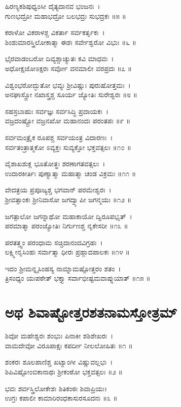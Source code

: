 ಹಿರಣ್ಯಕಶಿಪುಧ್ವಂಸೀ ದೈತ್ಯದಾನವ ಭಂಜನಃ~।\\
ಗುಣಭದ್ರೋ ಮಹಾಭದ್ರೋ ಬಲಭದ್ರಃ ಸುಭದ್ರಕಃ ॥೫ ॥

ಕರಾಳೋ ವಿಕರಾಳಶ್ಚ ವಿಕರ್ತಾ ಸರ್ವಕರ್ತೃಕಃ~।\\
ಶಿಂಶುಮಾರಸ್ತ್ರಿಲೋಕಾತ್ಮಾ ಈಶಃ ಸರ್ವೇಶ್ವರೋ ವಿಭುಃ ॥೬ ॥

ಭೈರವಾಡಂಬರೋ ದಿವ್ಯಶ್ಚಾಚ್ಯುತಃ ಕವಿ ಮಾಧವಃ~।\\
ಅಧೋಕ್ಷಜೋಽಕ್ಷರಃ ಸರ್ವೋ ವನಮಾಲೀ ವರಪ್ರದಃ ॥೭ ॥

ವಿಶ್ವಂಭರೋದ್ಭುತೋ ಭವ್ಯಃ ಶ್ರೀವಿಷ್ಣುಃ ಪುರುಷೋತ್ತಮಃ~।\\
ಅನಘಾಸ್ತ್ರೋ ನಖಾಸ್ತ್ರಶ್ಚ ಸೂರ್ಯ ಜ್ಯೋತಿಃ ಸುರೇಶ್ವರಃ ॥೮ ॥

ಸಹಸ್ರಬಾಹುಃ ಸರ್ವಜ್ಞಃ ಸರ್ವಸಿದ್ಧಿ ಪ್ರದಾಯಕಃ~।\\
ವಜ್ರದಂಷ್ಟ್ರೋ ವಜ್ರನಖೋ ಮಹಾನಂದಃ ಪರಂತಪಃ ॥೯ ॥

ಸರ್ವಮಂತ್ರೈಕ ರೂಪಶ್ಚ ಸರ್ವಯಂತ್ರ ವಿದಾರಣಃ~।\\
ಸರ್ವತಂತ್ರಾತ್ಮಕೋ ಽವ್ಯಕ್ತಃ ಸುವ್ಯಕ್ತೋ ಭಕ್ತವತ್ಸಲಃ ॥೧೦ ॥

ವೈಶಾಖಶುಕ್ಲ ಭೂತೋತ್ಥಃ ಶರಣಾಗತವತ್ಸಲಃ~।\\
ಉದಾರಕೀರ್ತಿಃ ಪುಣ್ಯಾತ್ಮಾ ಮಹಾತ್ಮಾ ಚಂಡ ವಿಕ್ರಮಃ ॥೧೧ ॥

ವೇದತ್ರಯ ಪ್ರಪೂಜ್ಯಶ್ಚ ಭಗವಾನ್ ಪರಮೇಶ್ವರಃ~।\\
ಶ್ರೀವತ್ಸಾಂಕಃ ಶ್ರೀನಿವಾಸೋ ಜಗದ್ವ್ಯಾಪೀ ಜಗನ್ಮಯಃ ॥೧೨ ॥

ಜಗತ್ಪಾಲೋ ಜಗನ್ನಾಥೋ ಮಹಾಕಾಯೋ ದ್ವಿರೂಪಭೃತ್~।\\
ಪರಮಾತ್ಮಾ ಪರಂಜ್ಯೋತಿಃ ನಿರ್ಗುಣಶ್ಚ ನೃಕೇಸರೀ ॥೧೩ ॥

ಪರತತ್ತ್ವಂ ಪರಂಧಾಮ ಸಚ್ಚಿದಾನಂದವಿಗ್ರಹಃ~।\\
ಲಕ್ಷ್ಮೀನೃಸಿಂಹಃ ಸರ್ವಾತ್ಮಾ ಧೀರಃ ಪ್ರಹ್ಲಾದಪಾಲಕಃ ॥೧೪ ॥

ಇದಂ ಶ್ರೀಮನ್ನೃಸಿಂಹಸ್ಯ ನಾಮ್ನಾಮಷ್ಟೋತ್ತರಂ ಶತಂ~।\\
ತ್ರಿಸಂಧ್ಯಂ ಯಃಪಠೇತ್ ಭಕ್ತ್ಯಾ ಸರ್ವಾಭೀಷ್ಟಮವಾಪ್ನುಯಾತ್ ॥೧೫ ॥

\section{ಅಥ ಶಿವಾಷ್ಟೋತ್ತರಶತನಾಮಸ್ತೋತ್ರಮ್ }
ಶಿವೋ ಮಹೇಶ್ವರಃ ಶಂಭುಃ ಪಿನಾಕೀ ಶಶಿಶೇಖರಃ~।\\
ವಾಮದೇವೋ ವಿರೂಪಾಕ್ಷಃ ಕಪರ್ದೀ ನೀಲಲೋಹಿತಃ ॥೧ ॥

ಶಂಕರಃ ಶೂಲಪಾಣಿಶ್ಚ ಖಟ್ವಾಂಗೀ ವಿಷ್ಣುವಲ್ಲಭಃ~।\\
ಶಿಪಿವಿಷ್ಟೋಂಬಿಕಾನಾಥಃ ಶ್ರೀಕಂಠೋ ಭಕ್ತವತ್ಸಲಃ ॥೨ ॥

ಭವಃ ಶರ್ವಸ್ತ್ರಿಲೋಕೇಶಃ ಶಿತಿಕಂಠಃ ಶಿವಾಪ್ರಿಯಃ।\\
ಉಗ್ರಃ ಕಪಾಲೀ ಕಾಮಾರಿರಂಧಕಾಸುರಸೂದನಃ ॥೩ ॥


